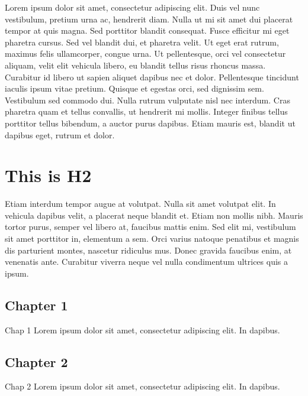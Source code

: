 

\pagestyle{empty}
\sphinxmaketitle
\pagestyle{plain}
\sphinxtableofcontents
\pagestyle{normal}
\label{\detokenize{intro::doc}}


\sphinxAtStartPar
Lorem ipsum dolor sit amet, consectetur adipiscing elit. Duis vel nunc vestibulum, pretium urna ac, hendrerit diam. Nulla ut mi sit amet dui placerat tempor at quis magna. Sed porttitor blandit consequat. Fusce efficitur mi eget pharetra cursus. Sed vel blandit dui, et pharetra velit. Ut eget erat rutrum, maximus felis ullamcorper, congue urna. Ut pellentesque, orci vel consectetur aliquam, velit elit vehicula libero, eu blandit tellus risus rhoncus massa. Curabitur id libero ut sapien aliquet dapibus nec et dolor. Pellentesque tincidunt iaculis ipsum vitae pretium. Quisque et egestas orci, sed dignissim sem. Vestibulum sed commodo dui. Nulla rutrum vulputate nisl nec interdum. Cras pharetra quam et tellus convallis, ut hendrerit mi mollis. Integer finibus tellus porttitor tellus bibendum, a auctor purus dapibus. Etiam mauris est, blandit ut dapibus eget, rutrum et dolor.


\chapter{This is H2}
\label{\detokenize{intro:this-is-h2}}
\sphinxAtStartPar
Etiam interdum tempor augue at volutpat. Nulla sit amet volutpat elit. In vehicula dapibus velit, a placerat neque blandit et. Etiam non mollis nibh. Mauris tortor purus, semper vel libero at, faucibus mattis enim. Sed elit mi, vestibulum sit amet porttitor in, elementum a sem. Orci varius natoque penatibus et magnis dis parturient montes, nascetur ridiculus mus. Donec gravida faucibus enim, at venenatis ante. Curabitur viverra neque vel nulla condimentum ultrices quis a ipsum.

\sphinxstepscope


\section{Chapter 1}
\label{\detokenize{part1/chap1:chapter-1}}\label{\detokenize{part1/chap1::doc}}
\sphinxAtStartPar
Chap 1 Lorem ipsum dolor sit amet, consectetur adipiscing elit. In dapibus.

\sphinxstepscope


\section{Chapter 2}
\label{\detokenize{part1/chap2:chapter-2}}\label{\detokenize{part1/chap2::doc}}
\sphinxAtStartPar
Chap 2 Lorem ipsum dolor sit amet, consectetur adipiscing elit. In dapibus.

